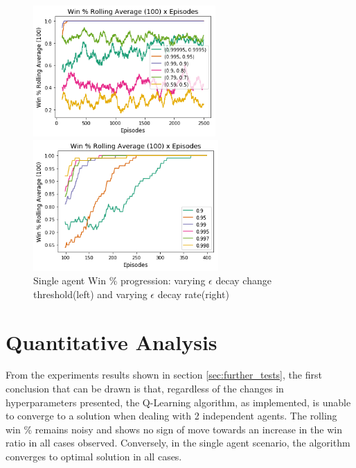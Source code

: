 \documentclass[10pt]{article}
\begin{document}
        \begin{figure}[h]
            \centering
            \begin{minipage}[b]{0.4\textwidth}
                \includegraphics[height=5cm]{Images/exp_6/1_change.png}
            \end{minipage}
            \hfill
            \begin{minipage}[b]{0.4\textwidth}
                \includegraphics[height=5cm]{Images/exp_6/2_threshold.png}
            \end{minipage}
            \caption{Single agent Win \% progression: varying $\epsilon$ decay change threshold(left) and varying $\epsilon$ decay rate(right)}
            \label{fig:exp6}
        \end{figure}


\section{Quantitative Analysis}\label{sec:quant_analysis}
    From the experiments results shown in section \ref{sec:further_tests}, the first conclusion that can be drawn is that, regardless of the changes in hyperparameters presented, the Q-Learning algorithm, as implemented, is unable to converge to a solution when dealing with 2 independent agents. The rolling win \% remains noisy and shows no sign of move towards an increase in the win ratio in all cases observed. Conversely, in the single agent scenario, the algorithm converges to optimal solution in all cases.
\end{document}
